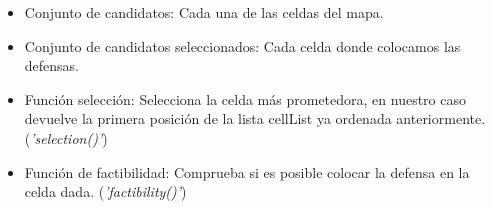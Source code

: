 \begin{itemize}
\item Conjunto de candidatos: Cada una de las celdas del mapa.
\item Conjunto de candidatos seleccionados: Cada celda donde colocamos las defensas.
\item Función selección: Selecciona la celda más prometedora, en nuestro caso devuelve la primera posición de la lista cellList ya ordenada anteriormente. (\textit{'selection()'})
\item Función de factibilidad: Comprueba si es posible colocar la defensa en la celda dada. (\textit{'factibility()'})
\end{itemize}